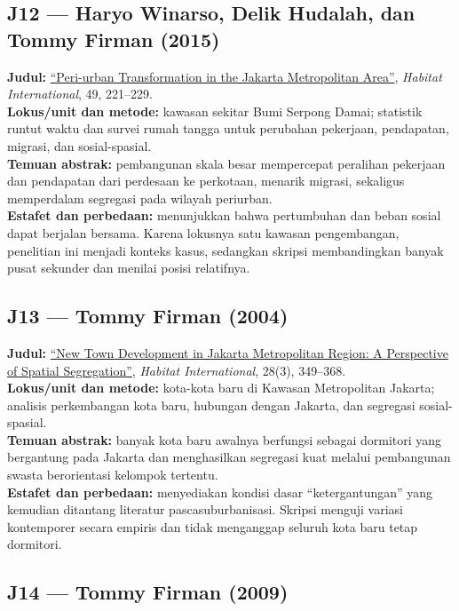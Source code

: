 \documentclass[
  indonesian,
  11pt,
  a4paper,
  oneside,
  openany]{report}
\begin{document}
\subsection{J12 --- Haryo Winarso, Delik Hudalah, dan Tommy Firman
(2015)}\label{j12-haryo-winarso-delik-hudalah-dan-tommy-firman-2015}

\textbf{Judul:}
\href{https://doi.org/10.1016/j.habitatint.2015.05.024}{``Peri-urban
Transformation in the Jakarta Metropolitan Area''}, \emph{Habitat
International}, 49, 221--229.\\
\textbf{Lokus/unit dan metode:} kawasan sekitar Bumi Serpong Damai;
statistik runtut waktu dan survei rumah tangga untuk perubahan
pekerjaan, pendapatan, migrasi, dan sosial-spasial.\\
\textbf{Temuan abstrak:} pembangunan skala besar mempercepat peralihan
pekerjaan dan pendapatan dari perdesaan ke perkotaan, menarik migrasi,
sekaligus memperdalam segregasi pada wilayah periurban.\\
\textbf{Estafet dan perbedaan:} menunjukkan bahwa pertumbuhan dan beban
sosial dapat berjalan bersama. Karena lokusnya satu kawasan
pengembangan, penelitian ini menjadi konteks kasus, sedangkan skripsi
membandingkan banyak pusat sekunder dan menilai posisi relatifnya.

\subsection{J13 --- Tommy Firman (2004)}\label{j13-tommy-firman-2004}

\textbf{Judul:}
\href{https://doi.org/10.1016/S0197-3975(03)00037-7}{``New Town
Development in Jakarta Metropolitan Region: A Perspective of Spatial
Segregation''}, \emph{Habitat International}, 28(3), 349--368.\\
\textbf{Lokus/unit dan metode:} kota-kota baru di Kawasan Metropolitan
Jakarta; analisis perkembangan kota baru, hubungan dengan Jakarta, dan
segregasi sosial-spasial.\\
\textbf{Temuan abstrak:} banyak kota baru awalnya berfungsi sebagai
dormitori yang bergantung pada Jakarta dan menghasilkan segregasi kuat
melalui pembangunan swasta berorientasi kelompok tertentu.\\
\textbf{Estafet dan perbedaan:} menyediakan kondisi dasar
``ketergantungan'' yang kemudian ditantang literatur pascasuburbanisasi.
Skripsi menguji variasi kontemporer secara empiris dan tidak menganggap
seluruh kota baru tetap dormitori.

\subsection{J14 --- Tommy Firman (2009)}\label{j14-tommy-firman-2009}
\end{document}
